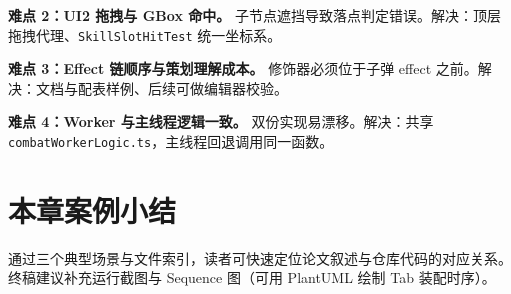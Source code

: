 \textbf{难点 2：UI2 拖拽与 GBox 命中。} 子节点遮挡导致落点判定错误。解决：顶层拖拽代理、\texttt{SkillSlotHitTest} 统一坐标系。

\textbf{难点 3：Effect 链顺序与策划理解成本。} 修饰器必须位于子弹 effect 之前。解决：文档与配表样例、后续可做编辑器校验。

\textbf{难点 4：Worker 与主线程逻辑一致。} 双份实现易漂移。解决：共享 \texttt{combatWorkerLogic.ts}，主线程回退调用同一函数。

\section{本章案例小结}

通过三个典型场景与文件索引，读者可快速定位论文叙述与仓库代码的对应关系。终稿建议补充运行截图与 Sequence 图（可用 PlantUML 绘制 Tab 装配时序）。
